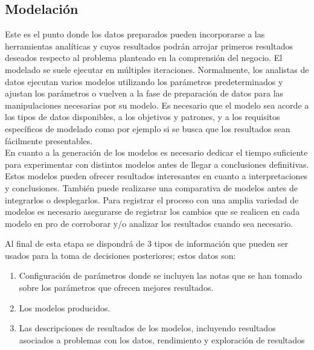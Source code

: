\subsection{Modelación} 

Este es el punto donde los datos preparados pueden incorporarse a las herramientas analíticas y cuyos resultados podrán arrojar primeros resultados deseados respecto al problema planteado en la comprensión del negocio. El modelado se suele ejecutar en múltiples iteraciones. Normalmente, los analistas de datos ejecutan varios modelos utilizando los parámetros predeterminados y ajustan los parámetros o vuelven a la fase de preparación de datos para las manipulaciones necesarias por su modelo. Es necesario que el modelo sea acorde a los tipos de datos disponibles, a los objetivos y patrones, y a los requisitos específicos de modelado como por ejemplo si se busca que los resultados sean fácilmente presentables.\\

En cuanto a la generación de los modelos es necesario dedicar el tiempo suficiente para experimentar con distintos modelos antes de llegar a conclusiones definitivas. Estos modelos pueden ofrecer resultados interesantes en cuanto a interpretaciones y conclusiones. También puede realizarse una comparativa de modelos antes de integrarlos o desplegarlos. Para registrar el proceso con una amplia variedad de modelos es necesario asegurarse de registrar los cambios que se realicen en cada modelo en pro de corroborar y/o analizar los resultados cuando sea necesario.

Al final de esta etapa se dispondrá de 3 tipos de información que pueden ser usados para la toma de decisiones posteriores; estos datos son: 
\begin{enumerate}
    \item Configuración de parámetros donde se incluyen las notas que se han tomado sobre los parámetros que ofrecen mejores resultados.
    \item Los modelos producidos.
    \item Las descripciones de resultados de los modelos, incluyendo resultados asociados a problemas con los datos, rendimiento y exploración de resultados
\end{enumerate}



